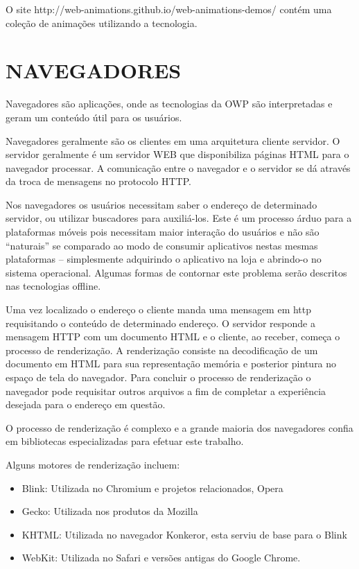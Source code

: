 O site http://web-animations.github.io/web-animations-demos/ contém uma
coleção de animações utilizando a tecnologia.

\section{NAVEGADORES}
Navegadores são aplicações, onde as tecnologias da OWP são
interpretadas e geram um conteúdo útil para os usuários.

Navegadores geralmente são os clientes em uma arquitetura cliente
servidor. O servidor geralmente é um servidor WEB que disponibiliza
páginas HTML para o navegador processar. A comunicação entre o 
navegador e o servidor se dá através da troca de mensagens no protocolo
HTTP.

Nos navegadores os usuários necessitam saber o endereço de determinado
servidor, ou utilizar buscadores para auxiliá-los. Este é um processo
árduo para a plataformas móveis pois necessitam maior interação
do usuários e não são “naturais” se comparado ao modo 
de consumir aplicativos nestas mesmas plataformas – simplesmente
adquirindo o aplicativo na loja e abrindo-o no sistema operacional.
Algumas formas de contornar este problema serão descritos nas tecnologias offline.

Uma vez localizado o endereço o cliente manda uma mensagem em http requisitando 
o conteúdo de determinado endereço.
O servidor responde a mensagem HTTP com um documento HTML
 e o cliente, ao receber, começa o processo de renderização. A renderização consiste
na decodificação de um documento em HTML para sua representação
memória e posterior pintura no espaço de tela do navegador. Para
concluir o processo de renderização o navegador pode requisitar outros
arquivos a fim de completar a experiência desejada para o endereço
em questão.

O processo de renderização é complexo e a grande maioria dos navegadores
confia em bibliotecas especializadas para efetuar este trabalho.

Alguns motores de renderização incluem:

\begin{itemize}
    \item Blink: Utilizada no Chromium e projetos relacionados, Opera
    \item Gecko: Utilizada nos produtos da Mozilla
    \item KHTML: Utilizada no navegador Konkeror, esta serviu de base para o Blink
    \item WebKit: Utilizada no Safari e versões antigas do Google Chrome.
\end{itemize}

